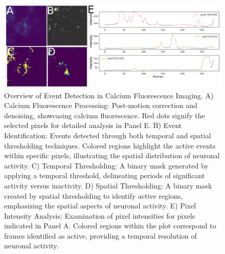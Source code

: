 \begin{figure}[!htb]
\begin{center}
\includegraphics[width=\linewidth]{figures/5.png}
\end{center}
\caption{Overview of Event Detection in Calcium Fluorescence Imaging. A) Calcium Fluorescence Processing: Post-motion correction and denoising, showcasing calcium fluorescence. Red dots signify the selected pixels for detailed analysis in Panel E. B) Event Identification: Events detected through both temporal and spatial thresholding techniques. Colored regions highlight the active events within specific pixels, illustrating the spatial distribution of neuronal activity. C) Temporal Thresholding: A binary mask generated by applying a temporal threshold, delineating periods of significant activity versus inactivity. D) Spatial Thresholding: A binary mask created by spatial thresholding to identify active regions, emphasizing the spatial aspects of neuronal activity. E) Pixel Intensity Analysis: Examination of pixel intensities for pixels indicated in Panel A. Colored regions within the plot correspond to frames identified as active, providing a temporal resolution of neuronal activity.}\label{fig:5}
\end{figure}

